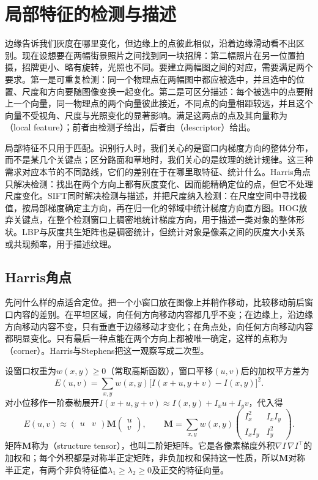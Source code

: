 \section{局部特征的检测与描述}
\label{sec:vision-features-local-features}

边缘告诉我们灰度在哪里变化，但边缘上的点彼此相似，沿着边缘滑动看不出区别。现在设想要在两幅街景照片之间找到同一块招牌：第二幅照片在另一位置拍摄，招牌更小、略有旋转，光照也不同。要建立两幅图之间的对应，需要满足两个要求。第一是可重复检测：同一个物理点在两幅图中都应被选中，并且选中的位置、尺度和方向要随图像变换一起变化。第二是可区分描述：每个被选中的点要附上一个向量，同一物理点的两个向量彼此接近，不同点的向量相距较远，并且这个向量不受视角、尺度与光照变化的显著影响。满足这两点的点及其向量称为（local feature）；前者由检测子给出，后者由（descriptor）给出。

局部特征不只用于匹配。识别行人时，我们关心的是窗口内梯度方向的整体分布，而不是某几个关键点；区分路面和草地时，我们关心的是纹理的统计规律。这三种需求对应本节的不同路线，它们的差别在于在哪里取特征、统计什么。Harris角点只解决检测：找出在两个方向上都有灰度变化、因而能精确定位的点，但它不处理尺度变化。SIFT同时解决检测与描述，并把尺度纳入检测：在尺度空间中寻找极值，按局部梯度确定主方向，再在归一化的邻域中统计梯度方向直方图。HOG放弃关键点，在整个检测窗口上稠密地统计梯度方向，用于描述一类对象的整体形状。LBP与灰度共生矩阵也是稠密统计，但统计对象是像素之间的灰度大小关系或共现频率，用于描述纹理。

\subsection{Harris角点}
\label{sec:vision-features-harris}

先问什么样的点适合定位。把一个小窗口放在图像上并稍作移动，比较移动前后窗口内容的差别。在平坦区域，向任何方向移动内容都几乎不变；在边缘上，沿边缘方向移动内容不变，只有垂直于边缘移动才变化；在角点处，向任何方向移动内容都明显变化。只有最后一种点能在两个方向上都被唯一确定，这样的点称为（corner）。Harris与Stephens把这一观察写成二次型。

设窗口权重为$w(x,y)\geq0$（常取高斯函数），窗口平移$(u,v)$后的加权平方差为
\[
  E(u,v)=\sum_{x,y}w(x,y)\bigl[I(x+u,y+v)-I(x,y)\bigr]^2.
\]
对小位移作一阶泰勒展开$I(x+u,y+v)\approx I(x,y)+I_xu+I_yv$，代入得
\begin{equation}
  E(u,v)\approx\begin{pmatrix}u&v\end{pmatrix}\bm M\begin{pmatrix}u\\v\end{pmatrix},\qquad
  \bm M=\sum_{x,y}w(x,y)\begin{pmatrix}I_x^2&I_xI_y\\I_xI_y&I_y^2\end{pmatrix}.
  \label{eq:vision-features-structure-tensor}
\end{equation}
矩阵$\bm M$称为（structure tensor），也叫二阶矩矩阵。它是各像素梯度外积$\nabla I\,\nabla I^{\top}$的加权和；每个外积都是对称半正定矩阵，非负加权和保持这一性质，所以$\bm M$对称半正定，有两个非负特征值$\lambda_1\geq\lambda_2\geq0$及正交的特征向量。


